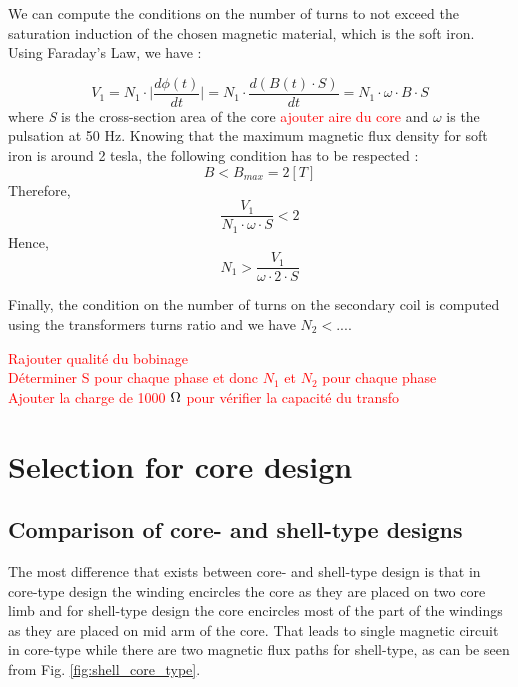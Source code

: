 \documentclass[12pt,a4paper]{report}
\begin{document}
We can compute the conditions on the number of turns to not exceed the saturation induction of the chosen magnetic material, which is the soft iron. Using Faraday's Law, we have :

\begin{equation}
    V_1 = N_1 \cdot \mid \frac{d\phi(t)}{dt} \mid = N_1 \cdot \frac{d(B(t)\cdot S)}{dt} = N_1 \cdot \omega \cdot B \cdot S
\end{equation}
where \textit{S} is the cross-section area of the core \textcolor{red}{ajouter aire du core} and $\omega$ is the pulsation at 50 Hz. Knowing that the maximum magnetic flux density for soft iron is around 2 tesla, the following condition has to be respected :
\begin{equation}
    B < B_{max} = 2 [T]
\end{equation}
Therefore, 
\begin{equation}
       \frac{V_1}{N_1 \cdot \omega \cdot S} < 2
\end{equation}
Hence,
\begin{equation}
N_1 > \frac{V_1}{\omega \cdot 2 \cdot S}
\end{equation}

Finally, the condition on the number of turns on the secondary coil is computed using the transformers turns ratio and we have $N_2 < ...$.

 \textcolor{red}{Rajouter qualité du bobinage}\\
 \textcolor{red}{Déterminer S pour chaque phase et donc $N_1$ et $N_2$ pour chaque phase}\\
\textcolor{red}{Ajouter la charge de 1000 $\ohm$ pour vérifier la capacité du transfo}

\section{Selection for core design}
\subsection{Comparison of core- and shell-type designs}
The most difference that exists between core- and shell-type design is that in core-type design the winding encircles the core as they are placed on two core limb and for shell-type design the core encircles most of the part of the windings as they are placed on mid arm of the core. That leads to single magnetic circuit in core-type while there are two magnetic flux paths for shell-type, as can be seen from Fig. \ref{fig:shell_core_type}.
\end{document}
